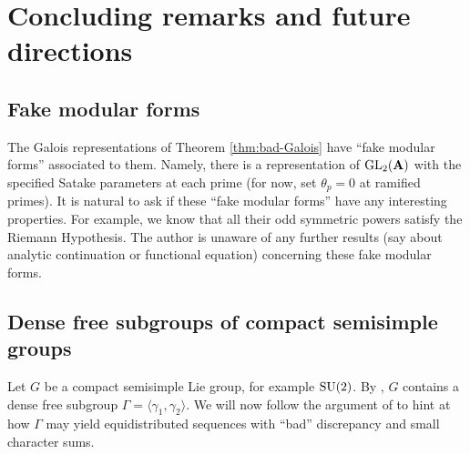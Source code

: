 
\chapter{Concluding remarks and future directions}





\section{Fake modular forms}

The Galois representations of Theorem \ref{thm:bad-Galois} have ``fake modular 
forms'' associated to them. Namely, there is a representation of $\operatorname{GL}_2(\mathbf{A})$ 
with the specified Satake parameters at each prime (for now, set $\theta_p = 0$ 
at ramified primes). It is natural to ask if these ``fake modular forms'' have 
any interesting properties. For example, we know that all their odd symmetric 
powers satisfy the Riemann Hypothesis. The author is unaware of any further 
results (say about analytic continuation or functional equation) concerning 
these fake modular forms. 





\section{Dense free subgroups of compact semisimple groups}

Let $G$ be a compact semisimple Lie group, for example $\operatorname{SU}(2)$. By 
\cite{breuillard-gelander-2003}, $G$ contains a dense free subgroup 
$\Gamma = \langle \gamma_1,\gamma_2\rangle$. We will now follow the argument of 
\cite{arnold-krylov-1963} to hint at how $\Gamma$ may yield equidistributed 
sequences with ``bad'' discrepancy and small character sums. 


